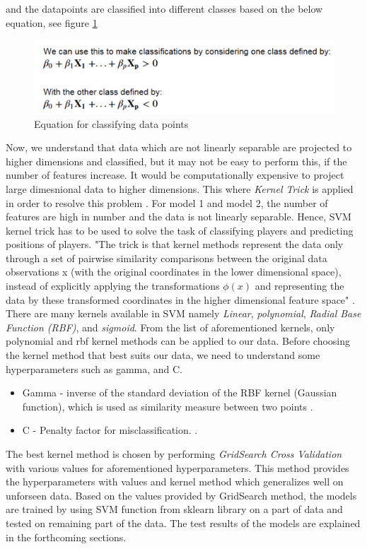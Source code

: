 \documentclass[format=sigconf]{acmart}
\begin{document}
and the datapoints are classified into different classes based on the below equation, see figure \ref{fig:classification}
\begin{figure}[H]
    \centering
    \includegraphics[scale=0.40]{dimension_equation_for_classification.png}
    \caption{Equation for classifying data points}
    \label{fig:classification}
\end{figure}
Now, we understand that data which are not linearly separable are projected to higher dimensions and classified, but it may not be 
easy to perform this, if the number of features increase. It would be computationally expensive to project large dimesnional data
to higher dimensions. This where \textit{Kernel Trick} is applied in order to resolve this problem \cite{kernel}. For model 1 and 
model 2, the number of features are high in number and the data is not linearly separable. Hence, SVM kernel trick has to be used
to solve the task of classifying players and predicting positions of players. "The trick is that kernel methods represent the data 
only through a set of pairwise similarity comparisons between the original data observations x (with the original coordinates in the 
lower dimensional space), instead of explicitly applying the transformations $\phi(x)$ and representing the data by these 
transformed coordinates in the higher dimensional feature space" \cite{kernel}. There are many kernels available in SVM namely
\textit{Linear}, \textit{polynomial}, \textit{Radial Base Function (RBF)}, and \textit{sigmoid}. From the list of aforementioned kernels, only polynomial
and rbf kernel methods can be applied to our data. Before choosing the kernel method that best suits our data, we need to understand
some hyperparameters such as gamma, and C.
\begin{itemize}
    \item Gamma - inverse of the standard deviation of the RBF kernel (Gaussian function), which is used as similarity measure between two points
    \cite{scikitlearn}.
    \item C - Penalty factor for misclassification. \cite{scikitlearn}.
\end{itemize}
The best kernel method is chosen by performing \textit{GridSearch Cross Validation} with various values for aforementioned hyperparameters.
This method provides the hyperparameters with values and kernel method which generalizes well on unforseen data. Based on the 
values provided by GridSearch method, the models are trained by using SVM function from sklearn library on a part of data and tested 
on remaining part of the data. The test results of the models are explained in the forthcoming sections.
\end{document}
